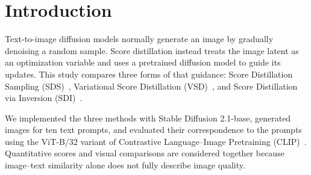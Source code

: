 \section{Introduction}
\label{sec:intro}

Text-to-image diffusion models normally generate an image by gradually denoising a random sample. Score distillation instead treats the image latent as an optimization variable and uses a pretrained diffusion model to guide its updates. This study compares three forms of that guidance: Score Distillation Sampling (SDS)~\cite{poole2023dreamfusion}, Variational Score Distillation (VSD)~\cite{wang2023prolificdreamer}, and Score Distillation via Inversion (SDI)~\cite{lukoianov2024sdi}.

We implemented the three methods with Stable Diffusion 2.1-base, generated images for ten text prompts, and evaluated their correspondence to the prompts using the ViT-B/32 variant of Contrastive Language--Image Pretraining (CLIP)~\cite{radford2021clip}. Quantitative scores and visual comparisons are considered together because image--text similarity alone does not fully describe image quality.

